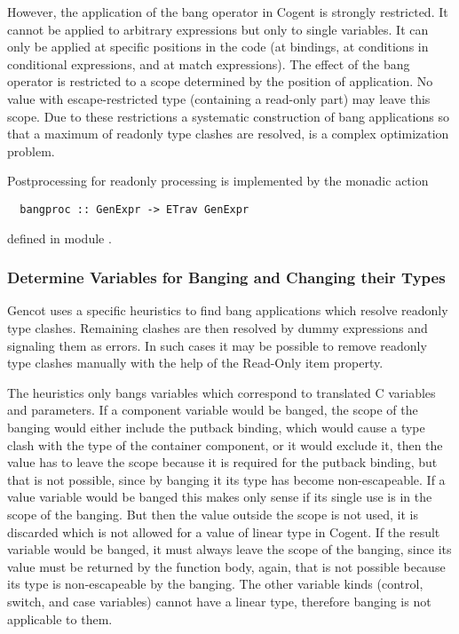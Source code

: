However, the application of the bang operator in Cogent is strongly restricted. It cannot be applied to arbitrary expressions
but only to single variables. It can only be applied at specific positions in the code (at bindings, at conditions in conditional
expressions, and at match expressions). The effect of the bang operator is restricted to a scope determined by the position of
application. No value with escape-restricted type (containing a read-only part) may leave this scope. Due to these restrictions
a systematic construction of bang applications so that a maximum of readonly type clashes are resolved, is a complex optimization
problem.

Postprocessing for readonly processing is implemented by the monadic action
\begin{verbatim}
  bangproc :: GenExpr -> ETrav GenExpr
\end{verbatim}
defined in module .

\subsubsection{Determine Variables for Banging and Changing their Types}

Gencot uses a specific heuristics to find bang applications which resolve readonly type clashes. Remaining clashes are then
resolved by dummy expressions and signaling them as errors. In such cases it may be possible to remove readonly type clashes
manually with the help of the Read-Only item property.

The heuristics only bangs variables which correspond to translated C variables and parameters. If a component variable would
be banged, the scope of the banging would either include the putback binding, which would cause a type clash with the type of
the container component, or it would exclude it, then the value has to leave the scope because it is required for the putback
binding, but that is not possible, since by banging it its type has become non-escapeable. If a value variable would be banged
this makes only sense if its single use is in the scope of the banging. But then the value outside the scope is not used, it
is discarded which is not allowed for a value of linear type in Cogent. If the result variable would be banged, it must always
leave the scope of the banging, since its value must be returned by the function body, again, that is not possible because its
type is non-escapeable by the banging. The other variable kinds (control, switch, and case variables) cannot have a linear
type, therefore banging is not applicable to them.

